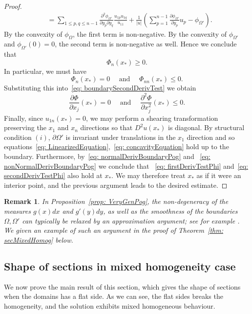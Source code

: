 \documentclass[12pt,reqno]{amsart}
\newtheorem{remark}{Remark}[section]
\newcommand{\del}{\partial}
\numberwithin{equation}{section}
\begin{document}
\begin{proof}
\[\begin{aligned}
&= \sum_{1 \leq p,q \leq n-1}\frac{\del^2 \phi_{\Omega'}}{\del y_p\del y_q}\frac{u_{1p}u_{1q}}{u_{11}} +\frac{1}{|u|} \left(\sum_{p=1}^{n-1}\frac{\del \phi_{\Omega'}}{\del y_p}u_p - \phi_{\Omega'}\right).
\end{aligned}
\]
By the convexity of $\phi_{\Omega}$, the first term is non-negative. By the convexity of $\phi_{\Omega'}$ and $\phi_{\Omega'}(0) = 0$, the second term is non-negative as well. Hence we conclude that
\[
\Phi_{n}(x_*) \geq 0. 
\]
In particular, we must have
\begin{equation}\label{eq: normalDerivBoundaryPog}
\Phi_{n}(x_*)=0 \quad \text{ and } \quad  \Phi_{nn}(x_*) \leq 0.
\end{equation}
Substituting this into~\eqref{eq: boundarySecondDerivTest} we obtain
\begin{equation}\label{eq: nonNormalDerivBoundaryPog}
\frac{\del \Phi}{\del x_j}(x_*)=0 \quad \text{ and } \quad \frac{\del^2 \Phi}{\del x_j^2}(x_*) \leq 0. 
\end{equation}
Finally, since $u_{1n}(x_*)=0$, we may perform a shearing transformation preserving the $x_1$ and $x_n$ directions so that $D^2u(x_*)$ is diagonal.  By structural condition $(i)$, $\del \Omega'$ is invariant under translations in the $x_1$ direction and so equations~\eqref{eq: LinearizedEquation},~\eqref{eq: concavityEquation} hold up to the boundary.  Furthermore, by~\eqref{eq: normalDerivBoundaryPog} and ~\eqref{eq: nonNormalDerivBoundaryPog} we conclude that ~\eqref{eq: firstDerivTestPhi} and~\eqref{eq: secondDerivTestPhi} also hold at $x_*$.  We may therefore treat $x_*$ as if it were an interior point, and the previous argument leads to the desired estimate.
\end{proof}

\begin{remark}
    In Proposition~\ref{prop: VeryGenPog}, the non-degeneracy of the measures $g(x)dx$ and $g'(y)dy$, as well as the smoothness of the boundaries $\Omega,\Omega'$ can typically be relaxed by an approximation argument; see for example \cite[Proposition 4.1]{Jhaveri-Savin}.  We given an example of such an argument in the proof of Theorem~\ref{thm: secMixedHomog} below.
\end{remark}

\subsection{Shape of sections in mixed homogeneity case}
We now prove the main result of this section, which gives the shape of sections when the domains has a flat side. As we can see, the flat sides breaks the homogeneity, and the solution exhibits mixed homogeneous behaviour. 
\end{document}
